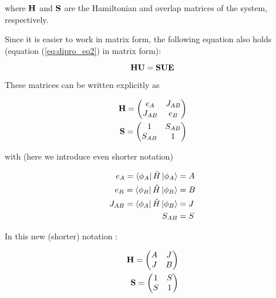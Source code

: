 where $\mathbf{ H }$ and $\mathbf{ S }$ are the Hamiltonian and overlap
matrices of the system, respectively. 

Since it is easier to work in matrix form, the following
equation also holds (equation (\ref{eq:dipro_eq2}) in matrix form):

\begin{equation}
 \mathbf{ H }\mathbf{ U } = \mathbf{ S }\mathbf{ U }\mathbf{ E }
  \label{eq:dipro_eq3}
\end{equation}

These matrices can be written explicitly as

\begin{equation}
 \begin{aligned}
  \mathbf{ H } = 
  \begin{pmatrix}
    e_A    &  J_{AB} \\
    J_{AB} &  e_B  
  \end{pmatrix} \\
  \mathbf{ S } = 
  \begin{pmatrix}
    1    &  S_{AB} \\
    S_{AB} &  1  
  \end{pmatrix}
  \end{aligned}
  \label{eq:dipro_eq4}
\end{equation}

with (here we introduce even shorter notation)

\begin{equation}
 \begin{aligned}
  e_A = \Bra{\phi_A}\hat{ H } \Ket{\phi_A} &= A\\
  e_B = \Bra{\phi_B}\hat{ H } \Ket{\phi_B} &= B\\
  J_{AB} = \Bra{\phi_A}\hat{ H } \Ket{\phi_B} &= J \\
  S_{AB} &= S 
 \end{aligned}
  \label{eq:dipro_eq5}
\end{equation}

In this new (shorter) notation :

\begin{equation}
 \begin{aligned}
  \mathbf{ H } = 
  \begin{pmatrix}
    A    &  J \\
    J    &  B  
  \end{pmatrix} \\
  \mathbf{ S } = 
  \begin{pmatrix}
    1    &  S \\
    S    &  1  
  \end{pmatrix}
  \end{aligned}
  \label{eq:dipro_eq6}
\end{equation}

